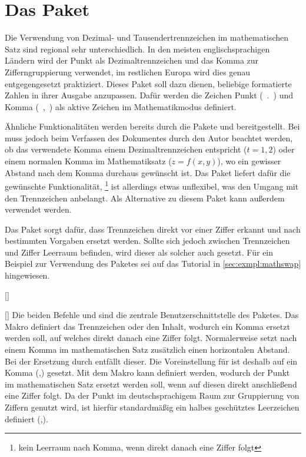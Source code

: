 \section{Das Paket }
%
%
%
\begin{Bundle*}{}
Die Verwendung von Dezimal- und Tausendertrennzeichen im mathematischen Satz 
sind regional sehr unterschiedlich. In den meisten englischsprachigen Ländern 
wird der Punkt als Dezimaltrennzeichen und das Komma zur Zifferngruppierung 
verwendet, im restlichen Europa wird dies genau entgegengesetzt praktiziert.
Dieses Paket soll dazu dienen, beliebige formatierte Zahlen in ihrer Ausgabe 
anzupassen. Dafür werden die Zeichen Punkt (\ .\ ) und Komma (\ ,\ ) als 
aktive Zeichen im Mathematikmodus definiert.

Ähnliche Funktionalitäten werden bereits durch die Pakete  und 
 bereitgestellt. Bei  muss jedoch beim
Verfassen des Dokumentes durch den Autor beachtet werden, ob das verwendete
Komma einem Dezimaltrennzeichen entspricht ($t=1,\!2$) oder einem normalen 
Komma im Mathematiksatz ($z=f(x,y)$), wo ein gewisser Abstand nach dem Komma 
durchaus gewünscht ist. Das Paket  liefert dafür die gewünschte 
Funktionalität,%
\footnote{kein Leerraum nach Komma, wenn direkt danach eine Ziffer folgt}
ist allerdings etwas unflexibel, was den Umgang mit den Trennzeichen anbelangt.
Als Alternative zu diesem Paket kann außerdem  verwendet 
werden.

Das Paket  sorgt dafür, dass Trennzeichen direkt vor einer 
Ziffer erkannt und nach bestimmten Vorgaben ersetzt werden. Sollte sich jedoch 
zwischen Trennzeichen und Ziffer Leerraum befinden, wird dieser als solcher
auch gesetzt. Für ein Beispiel zur Verwendung des Paketes sei auf das Tutorial 
 in \autoref{sec:exmpl:mathswap} hingewiesen.

\begin{Declaration}{[]}
\begin{Declaration}{[]}
\printdeclarationlist%
%
Die beiden Befehle  und  sind die zentrale 
Benutzerschnittstelle des Paketes. Das Makro  definiert das 
Trennzeichen oder den Inhalt, wodurch ein Komma ersetzt werden soll, auf 
welches direkt danach eine Ziffer folgt. Normalerweise setzt 
nach einem Komma im mathematischen Satz zusätzlich einen horizontalen Abstand.
Bei der Ersetzung durch  entfällt dieser. Die Voreinstellung
für  ist deshalb auf ein Komma (,) gesetzt. Mit dem Makro 
 kann definiert werden, wodurch der Punkt im mathematischen 
Satz ersetzt werden soll, wenn auf diesen direkt anschließend eine Ziffer 
folgt. Da der Punkt im deutschsprachigem Raum zur Gruppierung von Ziffern 
genutzt wird, ist hierfür standardmäßig ein halbes geschütztes Leerzeichen 
definiert (\bsc,).
\end{Declaration}
\end{Declaration}


\end{Bundle*}
